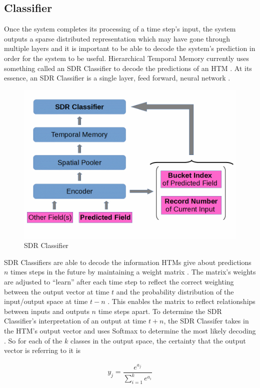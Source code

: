 \documentclass[oneside,12pt,openany]{book}
\begin{document}
	\subsection{Classifier}
	
	Once the system completes its processing of a time step's input, the system outputs a sparse distributed representation which may have gone through multiple layers and it is important to be able to decode the system's prediction in order for the system to be useful. Hierarchical Temporal Memory currently uses something called an SDR Classifier to decode the predictions of an HTM \cite{Dillon}. At its essence, an SDR Classifier is a single layer, feed forward, neural network \cite{Dillon}.
	
	\begin{figure}[h!]
		\centering
		\includegraphics[width=.6\linewidth]{images/SDRClassifier.jpg}
		\caption{SDR Classifier}
		\label{fig 3}
	\end{figure}
	
	SDR Classifiers are able to decode the information HTMs give about predictions $n$ times steps in the future by maintaining a weight matrix \cite{Dillon}. The matrix's weights are adjusted to ``learn'' after each time step to reflect the correct weighting between the output vector at time $t$ and the probability distribution of the input/output space at time $t-n$ \cite{Dillon}. This enables the matrix to reflect relationships between inputs and outputs $n$ time steps apart. To determine the SDR Classifier's interpretation of an output at time $t+n$, the SDR Classifer takes in the HTM's output vector and uses Softmax to determine the most likely decoding \cite{Dillon}. So for each of the $k$ classes in the output space, the certainty that the output vector is referring to it is 
	
	\begin{align}
	\label{eqn:htmclassact}
	y_{j} = \dfrac{e^{a_{j}}}{\sum_{i=1}^{k} e^{a_{i}}}
	\end{align}
	
\end{document}
